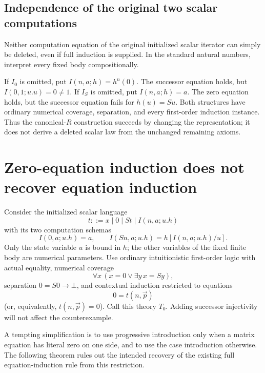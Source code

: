 \documentclass[11pt]{article}
\theoremstyle{definition}
\begin{document}
\subsection{Independence of the original two scalar computations}

Neither computation equation of the original initialized scalar iterator
can simply be deleted, even if full induction is supplied. In the standard
natural numbers, interpret every fixed body compositionally.

If $I_0$ is omitted, put $I(n,a;h)=h^n(0)$. The successor equation holds,
but $I(0,1;u.u)=0\ne1$. If $I_S$ is omitted, put $I(n,a;h)=a$. The zero
equation holds, but the successor equation fails for $h(u)=Su$.
Both structures have ordinary numerical coverage, separation, and every
first-order induction instance. Thus the canonical-$R$ construction succeeds
by changing the representation; it does not derive a deleted scalar law
from the unchanged remaining axioms.




\section{Zero-equation induction does not recover equation induction}
\label{zi:section}

Consider the initialized scalar language
\[
t::=x\mid0\mid St\mid I(n,a;u.h)
\]
with its two computation schemas
\[
I(0,a;u.h)=a,\qquad
I(Sn,a;u.h)=h[I(n,a;u.h)/u].
\]
Only the state variable \(u\) is bound in \(h\); the other variables of the fixed finite body are numerical parameters. Use ordinary intuitionistic first-order logic with actual equality, numerical coverage
\[
\forall x\,(x=0\lor\exists y\,x=Sy),
\]
separation \(0=S0\to\bot\), and contextual induction restricted to equations
\[
0=t(n,\vec p)
\]
(or, equivalently, \(t(n,\vec p)=0\)). Call this theory \(T_0\).
Adding successor injectivity will not affect the counterexample.

A tempting simplification is to use progressive introduction only when a matrix equation has literal zero on one side, and to use the case introduction otherwise. The following theorem rules out the intended recovery of the existing full equation-induction rule from this restriction.
\end{document}
